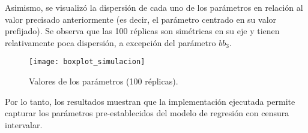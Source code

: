 Asimismo, se visualizó la dispersión de cada uno de los parámetros en relación al valor precisado anteriormente (es decir, el parámetro centrado en su valor prefijado). Se observa que las 100 réplicas son simétricas en su eje y tienen relativamente poca dispersión, a excepción del parámetro $bb_{3}$.

\begin{figure}[H]
	\texttt{[image: boxplot\_simulacion]}
	\caption{Valores de los parámetros (100 réplicas).}
\end{figure}
Por lo tanto, los resultados muestran que la implementación ejecutada permite capturar los parámetros pre-establecidos del modelo de regresión con censura intervalar.
